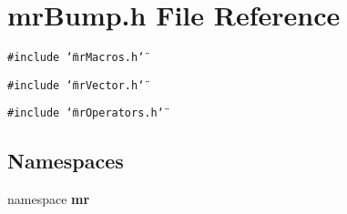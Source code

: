 \section{mr\-Bump.h File Reference}
\label{mrBump_8h}
{\tt \#include \char`\"{}mr\-Macros.h\char`\"{}}\par
{\tt \#include \char`\"{}mr\-Vector.h\char`\"{}}\par
{\tt \#include \char`\"{}mr\-Operators.h\char`\"{}}\par
\subsection*{Namespaces}
\begin{CompactItemize}
\item 
namespace {\bf mr}
\end{CompactItemize}
